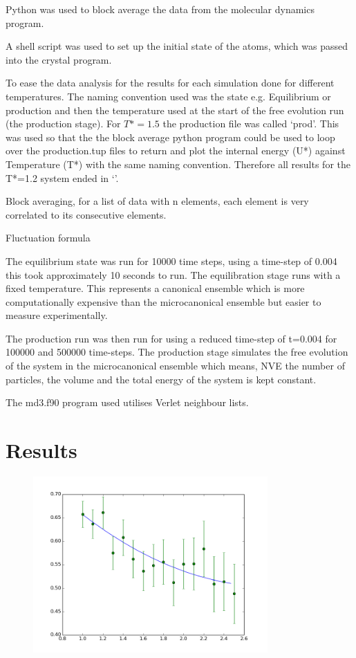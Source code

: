 \documentclass[a4paper, oneside 12pt]{article}
\begin{document}
\begin{addmargin}[-3em]{-3em}
Python was used to block average the data from the molecular dynamics program. 

A shell script was used to set up the initial state of the atoms, which was passed into the crystal program.

To ease the data analysis for the results for each simulation done for different temperatures. The naming convention used was the state e.g. Equilibrium or production and then the temperature used at the start of the free evolution run (the production stage). For $T* = 1.5$ the production file was called ‘prod’. This was used so that the the block average python program could be used to loop over the production.tup files to return and plot the internal energy (U*) against Temperature (T*) with the same naming convention. Therefore all results for the T*=1.2 system ended in ‘’.    

Block averaging, for a list of data with n elements, each element is very correlated to its consecutive elements.

Fluctuation formula 



The equilibrium state was run for 10000 time steps, using a time-step of 0.004 this took approximately 10 seconds to run. The equilibration stage runs with a fixed temperature. This represents a canonical ensemble which is more computationally expensive than the microcanonical ensemble but easier to measure experimentally.

The production run was then run for using a reduced time-step of t=0.004 for 100000 and 500000 time-steps. The production stage simulates the free evolution of the system in the microcanonical ensemble which means, NVE the number of particles, the volume and the total energy of the system is kept constant. 

The md3.f90 program used utilises Verlet neighbour lists. 



\newpage
\section{Results}



\begin{figure}[h]
\centering
\includegraphics[width=0.8\textwidth]{cvgood.png}
\caption{ }
\end{figure}



\end{addmargin}
\end{document}
